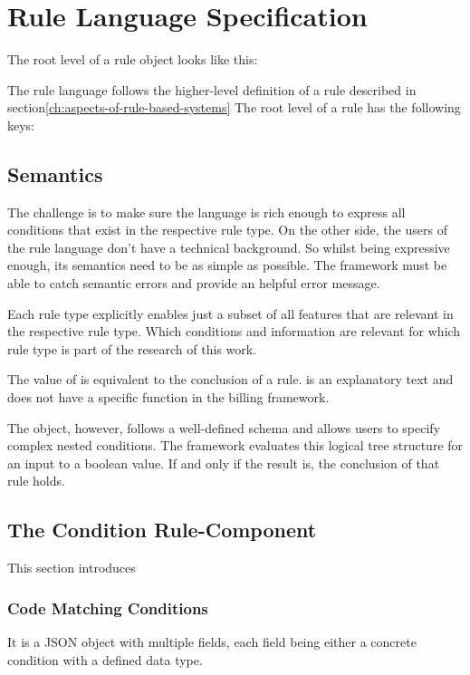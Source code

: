 \section{Rule Language Specification}\label{sec:rule-language-specification}

The root level of a rule object looks like this:

The rule language follows the higher-level definition of a rule described in section\ref{ch:aspects-of-rule-based-systems}
The root level of a rule has the following keys:

\subsection{Semantics}
The challenge is to make sure the language is rich enough
to express all conditions that exist in the respective rule type.
On the other side, the users of the rule language don't have a technical background.
So whilst being expressive enough, its semantics need to be as simple as possible.
The framework must be able to catch semantic errors and provide an helpful error message.

Each rule type explicitly enables just a subset of all features that are relevant in the respective rule type.
Which conditions and information are relevant for which rule type is part of the research of this work.







The value of is equivalent to the conclusion of a rule\cite{abdullah2017performance}.
 is an explanatory text and does not have a specific function in the billing framework.

The object, however, follows a well-defined schema and allows users to specify complex nested conditions.
The framework evaluates this logical tree structure for an input to a boolean value.
If and only if the result is, the conclusion of that rule holds.


\subsection{The Condition Rule-Component}\label{subsec:the-condition-component}

This section introduces


\subsubsection{Code Matching Conditions}





It is a JSON object with multiple fields, each field being either a concrete condition with a defined data type.



